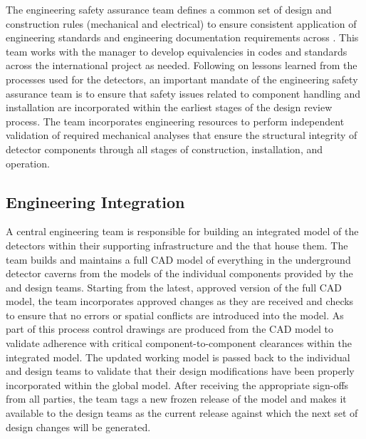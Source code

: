 The  engineering safety assurance team defines a common 
set of design and construction rules (mechanical and electrical) to 
ensure consistent application of engineering standards and engineering 
documentation requirements across .  This team works 
with the   manager to develop equivalencies 
in codes and standards across the international project as needed.  
Following on lessons learned from the processes used for the 
 detectors, an important mandate of the engineering 
safety assurance team is to ensure that safety issues related to 
component handling and installation are incorporated within the 
earliest stages of the design review process.  The  team 
incorporates engineering resources to perform independent validation 
of required mechanical analyses that ensure the structural integrity 
of detector components through all stages of construction, installation, 
and operation.

\subsection{Engineering Integration}
\label{sec:dune_engineering}

A central  engineering team is responsible for building 
an integrated model of the detectors within their supporting
infrastructure and the  that house them.  The team
builds and maintains a full \threed CAD model of everything in the
underground detector caverns from the models of the individual
components provided by the  and  design 
teams.  Starting from the latest, approved version of the full CAD 
model, the  team incorporates approved changes as they 
are received and checks to ensure that no errors or spatial conflicts 
are introduced into the model.  As part of this process \twod control 
drawings are produced from the \threed CAD model to validate adherence 
with critical component-to-component clearances within the integrated
model.  The updated working model is passed back to the individual
 and  design teams to validate that their
design modifications have been properly incorporated within the 
global model.  After receiving the appropriate sign-offs from all 
parties, the  team tags a new frozen release of the model 
and makes it available to the design teams as the current release 
against which the next set of design changes will be generated.

